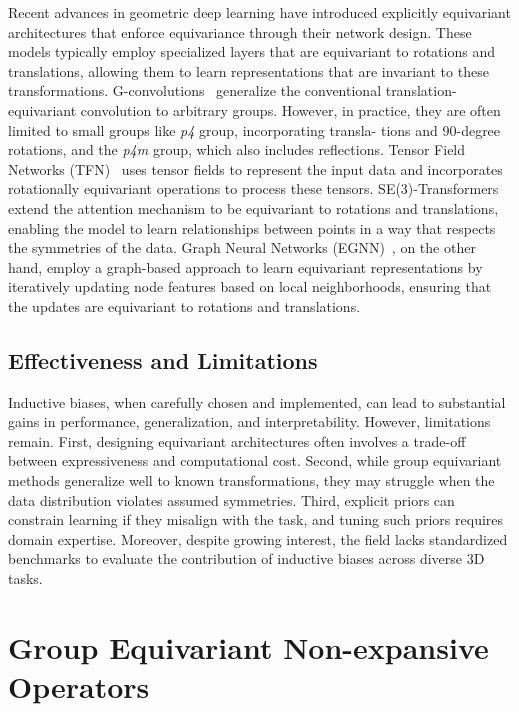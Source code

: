 Recent advances in geometric deep learning have introduced explicitly
equivariant architectures that enforce equivariance through their network
design.
%
These models typically employ specialized layers that are equivariant to
rotations and translations, allowing them to learn representations that are
invariant to these transformations.
%
G-convolutions~\cite{cohen2016group} generalize the conventional
translation-equivariant convolution to arbitrary groups. However, in practice,
they are often limited to small groups like \textit{p4} group, incorporating
transla- tions and 90-degree rotations, and the \textit{p4m} group, which also
includes reflections.
%
Tensor Field Networks (TFN)~\cite{thomas2018tensor} uses tensor fields to
represent the input data and incorporates rotationally equivariant operations
to process these tensors.
%
SE(3)-Transformers~\cite{fuchs2020se} extend the attention mechanism to be
equivariant to rotations and translations, enabling the model to learn
relationships between points in a way that respects the symmetries of the data.
%
Graph Neural Networks (EGNN)~\cite{satorras2021n}, on the other hand, employ a
graph-based approach to learn equivariant representations by iteratively
updating node features based on local neighborhoods, ensuring that the updates
are equivariant to rotations and translations.

\subsection{Effectiveness and Limitations}
Inductive biases, when carefully chosen and implemented, can lead to
substantial gains in performance, generalization, and interpretability.
%
However, limitations remain. First, designing equivariant architectures often
involves a trade-off between expressiveness and computational cost. Second,
while group equivariant methods generalize well to known transformations, they
may struggle when the data distribution violates assumed symmetries. Third,
explicit priors can constrain learning if they misalign with the task, and
tuning such priors requires domain expertise.
%
Moreover, despite growing interest, the field lacks standardized benchmarks to
evaluate the contribution of inductive biases across diverse 3D tasks.

\section{Group Equivariant Non-expansive Operators}\label{sec:geneos}


